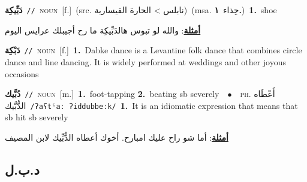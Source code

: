 \documentclass[10pt,a4paper,twoside]{article} %
\begin{document}
\begin{multicols}{2}
{{{{{\setlength\topsep{0pt}\textbf{\foreignlanguage{arabic}{دَبِّيكِة}}\ {\color{gray}\texttt{//}\color{black}}\ \textsc{noun}\ [f.]\ (src. \color{gray}\foreignlanguage{arabic}{نابلس > الحارة القيسارية}\color{black})\ \color{gray}(msa. \foreignlanguage{arabic}{حِذاء}~\foreignlanguage{arabic}{\textbf{١.}})\color{black}\ \textbf{1.}~shoe\  \begin{flushright}\color{gray}\foreignlanguage{arabic}{\textbf{\underline{\foreignlanguage{arabic}{أمثلة}}}: والله لو تبوس هالدَبِّيكِة ما رح أجيبلك عرايس اليوم}\end{flushright}\color{black}} \vspace{2mm}

{\setlength\topsep{0pt}\textbf{\foreignlanguage{arabic}{دَبْكِة}}\ {\color{gray}\texttt{//}\color{black}}\ \textsc{noun}\ [f.]\ \textbf{1.}~Dabke dance is a Levantine folk dance that combines circle dance and line dancing. It is widely performed at weddings and other joyous occasions\ 

{\setlength\topsep{0pt}\textbf{\foreignlanguage{arabic}{دُبَّيك}}\ {\color{gray}\texttt{//}\color{black}}\ \textsc{noun}\ [m.]\ \textbf{1.}~foot-tapping  \textbf{2.}~beating sb severely\ \ $\bullet$\ \ \textsc{ph.} \color{gray} \foreignlanguage{arabic}{أَعْطَاه الدُّبَّيك}\color{black}\ {\color{gray}\texttt{/{\sffamily ʔaʕtˤaː ʔiddubbeːk}/}\color{black}}\ \textbf{1.}~It is an idiomatic expression that means that sb hit sb severely\  \begin{flushright}\color{gray}\foreignlanguage{arabic}{\textbf{\underline{\foreignlanguage{arabic}{أمثلة}}}: أما شو راح عليك امبارح. أخوك أعطاه الدُّبِّيك لابن المصيف}\end{flushright}\color{black}} \vspace{2mm}

\vspace{-3mm}
\subsection*{\color{blue}\foreignlanguage{arabic}{د.ب.ل}\color{blue}{}} 

}}}}}
\end{multicols}
\end{document}
